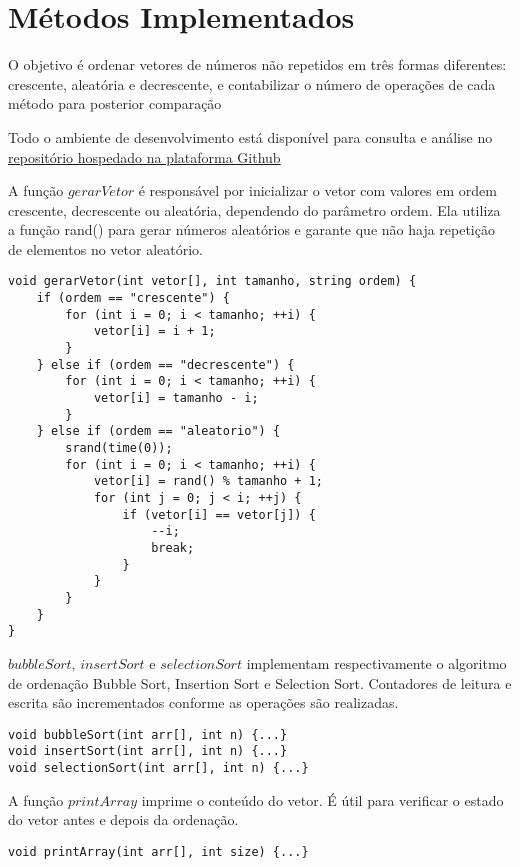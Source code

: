 \section{Métodos Implementados}
O objetivo é ordenar vetores de números não repetidos em três formas diferentes: crescente, aleatória e decrescente, e contabilizar o número de operações de cada método para posterior comparação

Todo o ambiente de desenvolvimento está disponível para consulta e análise no \href{https://github.com/LucasWithBoots/algoritmos_ordenacao_cpp/blob/master/main.cpp}{repositório hospedado na plataforma Github}

A função $gerarVetor$ é responsável por inicializar o vetor com valores em ordem crescente, decrescente ou aleatória, dependendo do parâmetro ordem. Ela utiliza a função rand() para gerar números aleatórios e garante que não haja repetição de elementos no vetor aleatório.

\begin{verbatim}
void gerarVetor(int vetor[], int tamanho, string ordem) {
    if (ordem == "crescente") {
        for (int i = 0; i < tamanho; ++i) {
            vetor[i] = i + 1;
        }
    } else if (ordem == "decrescente") {
        for (int i = 0; i < tamanho; ++i) {
            vetor[i] = tamanho - i;
        }
    } else if (ordem == "aleatorio") {
        srand(time(0));
        for (int i = 0; i < tamanho; ++i) {
            vetor[i] = rand() % tamanho + 1;
            for (int j = 0; j < i; ++j) {
                if (vetor[i] == vetor[j]) {
                    --i;
                    break;
                }
            }
        }
    }
}
\end{verbatim}

$bubbleSort$, $insertSort$ e $selectionSort$ implementam respectivamente o algoritmo de ordenação Bubble Sort, Insertion Sort e Selection Sort. Contadores de leitura e escrita são incrementados conforme as operações são realizadas.

\begin{verbatim}
void bubbleSort(int arr[], int n) {...}
void insertSort(int arr[], int n) {...}
void selectionSort(int arr[], int n) {...}
\end{verbatim}

A função $printArray$ imprime o conteúdo do vetor. É útil para verificar o estado do vetor antes e depois da ordenação.

\begin{verbatim}
void printArray(int arr[], int size) {...}
\end{verbatim}